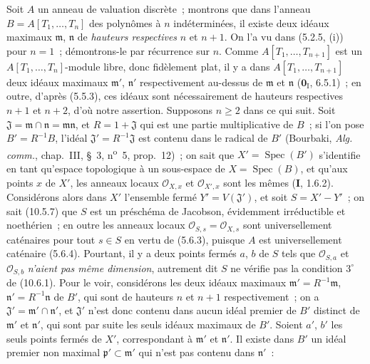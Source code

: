 \begin{env}[10.7.3]
\label{IV.10.7.3-fr}
Soit $A$ un anneau de valuation discrète~; montrons que dans l'anneau
$B=A[T_1,\ldots,T_n]$ des polynômes à $n$ indéterminées, il existe deux idéaux
maximaux $\mathfrak m$, $\mathfrak n$ de \emph{hauteurs respectives} $n$ et
$n+1$. On l'a vu dans (5.2.5, (i)) pour $n=1$~; démontrons-le par récurrence sur
$n$. Comme $A[T_1,\ldots,T_{n+1}]$ est un $A[T_1,\ldots,T_n]$-module libre,
donc fidèlement plat, il y a dans $A[T_1,\ldots,T_{n+1}]$ deux idéaux maximaux
$\mathfrak m'$, $\mathfrak n'$ respectivement au-dessus de $\mathfrak m$ et
$\mathfrak n$ ($\mathbf 0_{\mathrm I}$, 6.5.1)~; en outre, d'après (5.5.3), ces
idéaux sont nécessairement de hauteurs respectives $n+1$ et $n+2$, d'où notre
assertion. Supposons $n\geq2$ dans ce qui suit. Soit
$\mathfrak J=\mathfrak m\cap\mathfrak n=\mathfrak m\mathfrak n$, et
$R=1+\mathfrak J$ qui est une partie multiplicative de $B$~; si l'on pose
$B'=R^{-1}B$, l'idéal $\mathfrak J'=R^{-1}\mathfrak J$ est contenu dans le
radical de $B'$ (Bourbaki, \emph{Alg. comm.}, chap.~III, \S~3,
n\textsuperscript{o}~5, prop.~12)~; on sait que $X'=\operatorname{Spec}(B')$
s'identifie en tant qu'espace topologique à un sous-espace de
$X=\operatorname{Spec}(B)$, et qu'aux points $x$ de $X'$, les anneaux locaux
$\mathcal O_{X,x}$ et $\mathcal O_{X',x}$ sont les mêmes (\textbf{I}, 1.6.2).
Considérons alors dans $X'$ l'ensemble fermé $Y'=V(\mathfrak J')$, et soit
$S=X'-Y'$~; on sait (10.5.7) que $S$ est un préschéma de Jacobson, évidemment
irréductible et noethérien~; en outre les anneaux locaux
$\mathcal O_{S,s}=\mathcal O_{X,s}$ sont universellement caténaires pour tout $s\in S$
en vertu de (5.6.3), puisque $A$ est universellement caténaire (5.6.4). Pourtant,
il y a deux points fermés $a$, $b$ de $S$ tels que $\mathcal O_{S,a}$ et
$\mathcal O_{S,b}$ \emph{n'aient pas même dimension}, autrement dit $S$ ne vérifie
pas la condition $3^\circ$ de (10.6.1). Pour le voir, considérons les deux idéaux
maximaux $\mathfrak m'=R^{-1}\mathfrak m$, $\mathfrak n'=R^{-1}\mathfrak n$ de
$B'$, qui sont de hauteurs $n$ et $n+1$ respectivement~; on a
$\mathfrak J'=\mathfrak m'\cap\mathfrak n'$, et $\mathfrak J'$ n'est donc
contenu dans aucun idéal premier de $B'$ distinct de $\mathfrak m'$ et
$\mathfrak n'$, qui sont par suite les seuls idéaux maximaux de $B'$. Soient
$a'$, $b'$ les seuls points fermés de $X'$, correspondant à $\mathfrak m'$ et
$\mathfrak n'$. Il existe dans $B'$ un idéal premier non maximal
$\mathfrak p'\subset\mathfrak m'$ qui n'est pas contenu dans $\mathfrak n'$~:

\end{env}
